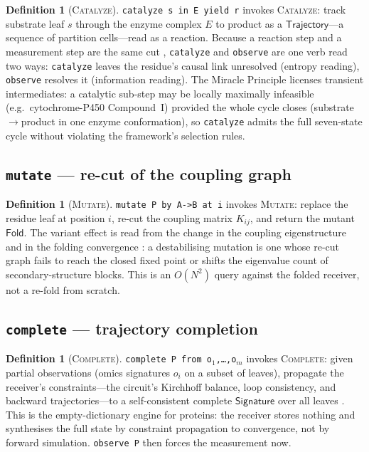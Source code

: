 \documentclass[11pt,a4paper]{article}
\theoremstyle{thmstyle}
\theoremstyle{definition}
\newtheorem{definition}[theorem]{Definition}
\theoremstyle{remark}
\newcommand{\shk}[1]{\texttt{#1}}
\begin{document}
\begin{definition}[\textsc{Catalyze}]
\label{def:catalyze}
\shk{catalyze\ s\ in\ E\ yield\ r} invokes \textsc{Catalyze}: track
substrate leaf $s$ through the enzyme complex $E$ to product as a
$\mathsf{Trajectory}$---a sequence of partition cells---read as a reaction.
Because a reaction step and a measurement step are the same cut
\citep{sachikonye2025causal}, \shk{catalyze} and \shk{observe} are one verb
read two ways: \shk{catalyze} leaves the residue's causal link unresolved
(entropy reading), \shk{observe} resolves it (information reading). The
Miracle Principle \citep{sachikonye2025expralg} licenses transient
intermediates: a catalytic sub-step may be locally maximally infeasible
(e.g.\ cytochrome-P450 Compound~I) provided the whole cycle closes
(substrate$\to$product in one enzyme conformation), so \shk{catalyze}
admits the full seven-state cycle without violating the framework's
selection rules.
\end{definition}

\subsection{\texorpdfstring{\shk{mutate} --- re-cut of the coupling graph}{Mutate}}
\label{sec:stdlib-mutate}

\begin{definition}[\textsc{Mutate}]
\label{def:mutate}
\shk{mutate\ P\ by\ A->B\ at\ i} invokes \textsc{Mutate}: replace the
residue leaf at position $i$, re-cut the coupling matrix $K_{ij}$, and
return the mutant $\mathsf{Fold}$. The variant effect is read from the
change in the coupling eigenstructure and in the folding convergence
\citep{sachikonye2025fold}: a destabilising mutation is one whose re-cut
graph fails to reach the closed fixed point or shifts the eigenvalue count
of secondary-structure blocks. This is an $O(N^2)$ query against the folded
receiver, not a re-fold from scratch.
\end{definition}

\subsection{\texorpdfstring{\shk{complete} --- trajectory completion}{Complete}}
\label{sec:stdlib-complete}

\begin{definition}[\textsc{Complete}]
\label{def:complete}
\shk{complete\ P\ from\ o$_1$,\ldots,o$_m$} invokes \textsc{Complete}:
given partial observations (omics signatures $o_i$ on a subset of leaves),
propagate the receiver's constraints---the circuit's Kirchhoff balance,
loop consistency, and backward trajectories---to a self-consistent complete
$\mathsf{Signature}$ over all leaves \citep{sachikonye2025sbs}. This is the
empty-dictionary engine for proteins: the receiver stores nothing and
synthesises the full state by constraint propagation to convergence, not by
forward simulation. \shk{observe\ P} then forces the measurement now.
\end{definition}
\end{document}
